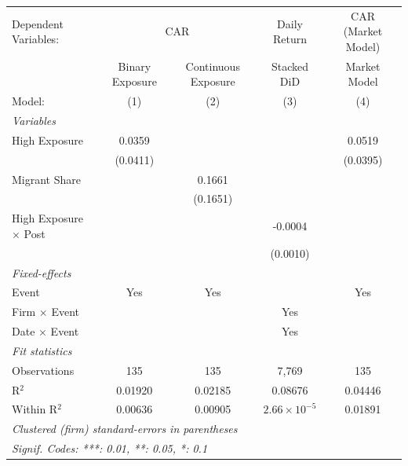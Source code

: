    \begin{tabular}{lcccc}
      \tabularnewline \midrule \midrule
      Dependent Variables: & \multicolumn{2}{c}{CAR} & Daily Return & CAR (Market Model)\\
                                                       & Binary Exposure & Continuous Exposure & Stacked DiD           & Market Model \\
      Model:                                           & (1)             & (2)                 & (3)                   & (4)\\
      \midrule
      \emph{Variables}\\
      High Exposure                                    & 0.0359          &                     &                       & 0.0519\\
                                                       & (0.0411)        &                     &                       & (0.0395)\\
      Migrant Share                                    &                 & 0.1661              &                       &   \\
                                                       &                 & (0.1651)            &                       &   \\
      High Exposure $\times$ Post                      &                 &                     & -0.0004               &   \\
                                                       &                 &                     & (0.0010)              &   \\
      \midrule
      \emph{Fixed-effects}\\
      Event                                            & Yes             & Yes                 &                       & Yes\\
      Firm $\times$ Event                              &                 &                     & Yes                   & \\
      Date $\times$ Event                              &                 &                     & Yes                   & \\
      \midrule
      \emph{Fit statistics}\\
      Observations                                     & 135             & 135                 & 7,769                 & 135\\
      R$^2$                                            & 0.01920         & 0.02185             & 0.08676               & 0.04446\\
      Within R$^2$                                     & 0.00636         & 0.00905             & $2.66\times 10^{-5}$  & 0.01891\\
      \midrule \midrule
      \multicolumn{5}{l}{\emph{Clustered (firm) standard-errors in parentheses}}\\
      \multicolumn{5}{l}{\emph{Signif. Codes: ***: 0.01, **: 0.05, *: 0.1}}\\
   \end{tabular}
